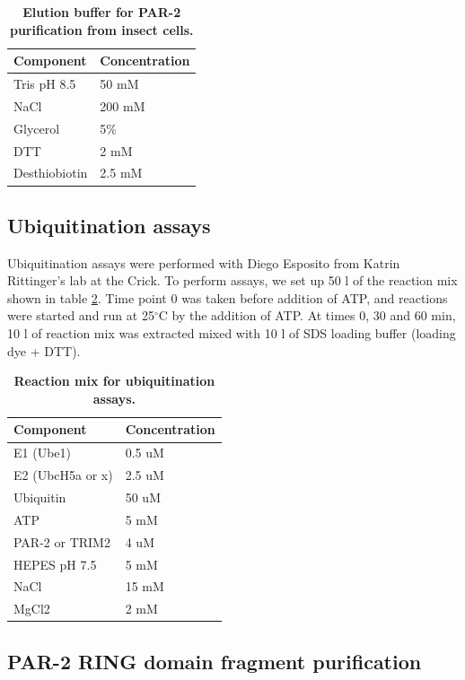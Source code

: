 \documentclass[12pt]{"report"}
\newcommand{\mycaption}[2]{\caption[#1]{\textbf{#1.} #2}}
\begin{document}
\begin{table}[]
\footnotesize
\begin{tabular}{|l|l|}
\hline
\textbf{Component} & \textbf{Concentration} \\ \hline
Tris pH 8.5 & 50 mM \\ \hline
NaCl & 200 mM \\ \hline
Glycerol & 5\% \\ \hline
DTT & 2 mM \\ \hline
Desthiobiotin & 2.5 mM \\ \hline
\end{tabular}
\mycaption{Elution buffer for PAR-2 purification from insect cells}{}
\label{table:insect_cell_elution_buffer}
\end{table}


\subsection{Ubiquitination assays}

Ubiquitination assays were performed with Diego Esposito from Katrin Rittinger's lab at the Crick. To perform assays, we set up 50 \textmu l of the reaction mix shown in table \ref{table:ubiquitin_assay}. Time point 0 was taken before addition of ATP, and reactions were started and run at 25$^{\circ}$C by the addition of ATP. At times 0, 30 and 60 min, 10 \textmu l of reaction mix was extracted mixed with 10 \textmu l of SDS loading buffer (loading dye + DTT).

\begin{table}[]
\footnotesize
\begin{tabular}{|l|l|}
\hline
\textbf{Component} & \textbf{Concentration} \\ \hline
E1 (Ube1) & 0.5 uM \\ \hline
E2 (UbcH5a or x) & 2.5 uM \\ \hline
Ubiquitin & 50 uM \\ \hline
ATP & 5 mM \\ \hline
PAR-2 or TRIM2 & 4 uM \\ \hline
HEPES pH 7.5 & 5 mM \\ \hline
NaCl & 15 mM \\ \hline
MgCl2 & 2 mM \\ \hline
\end{tabular}
\mycaption{Reaction mix for ubiquitination assays}{}
\label{table:ubiquitin_assay}
\end{table}

\subsection{PAR-2 RING domain fragment purification}
\end{document}
